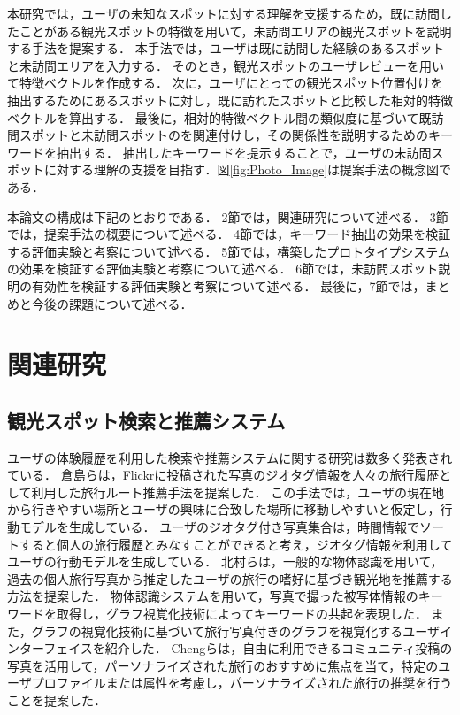 \documentclass{deimj}
\begin{document}
本研究では，ユーザの未知なスポットに対する理解を支援するため，既に訪問したことがある観光スポットの特徴を用いて，未訪問エリアの観光スポットを説明する手法を提案する．
本手法では，ユーザは既に訪問した経験のあるスポットと未訪問エリアを入力する．
そのとき，観光スポットのユーザレビューを用いて特徴ベクトルを作成する．
次に，ユーザにとっての観光スポット位置付けを抽出するためにあるスポットに対し，既に訪れたスポットと比較した相対的特徴ベクトルを算出する．
最後に，相対的特徴ベクトル間の類似度に基づいて既訪問スポットと未訪問スポットのを関連付けし，その関係性を説明するためのキーワードを抽出する．
抽出したキーワードを提示することで，ユーザの未訪問スポットに対する理解の支援を目指す．図\ref{fig:Photo_Image}は提案手法の概念図である．

本論文の構成は下記のとおりである．
2節では，関連研究について述べる．
3節では，提案手法の概要について述べる．
4節では，キーワード抽出の効果を検証する評価実験と考察について述べる．
5節では，構築したプロトタイプシステムの効果を検証する評価実験と考察について述べる．
6節では，未訪問スポット説明の有効性を検証する評価実験と考察について述べる．
最後に，7節では，まとめと今後の課題について述べる．


\section{関連研究}
\label{sec:関連研究}
\subsection{観光スポット検索と推薦システム}
ユーザの体験履歴を利用した検索や推薦システムに関する研究は数多く発表されている．
倉島ら\cite{Codd01}は，Flickrに投稿された写真のジオタグ情報を人々の旅行履歴として利用した旅行ルート推薦手法を提案した．
この手法では，ユーザの現在地から行きやすい場所とユーザの興味に合致した場所に移動しやすいと仮定し，行動モデルを生成している．
ユーザのジオタグ付き写真集合は，時間情報でソートすると個人の旅行履歴とみなすことができると考え，ジオタグ情報を利用してユーザの行動モデルを生成している．
北村らは\cite{Codd02}，一般的な物体認識を用いて，過去の個人旅行写真から推定したユーザの旅行の嗜好に基づき観光地を推薦する方法を提案した．
物体認識システムを用いて，写真で撮った被写体情報のキーワードを取得し，グラフ視覚化技術によってキーワードの共起を表現した．
また，グラフの視覚化技術に基づいて旅行写真付きのグラフを視覚化するユーザインターフェイスを紹介した．
Chengらは\cite{Codd03}，自由に利用できるコミュニティ投稿の写真を活用して，パーソナライズされた旅行のおすすめに焦点を当て，特定のユーザプロファイルまたは属性を考慮し，パーソナライズされた旅行の推奨を行うことを提案した．
\end{document}
